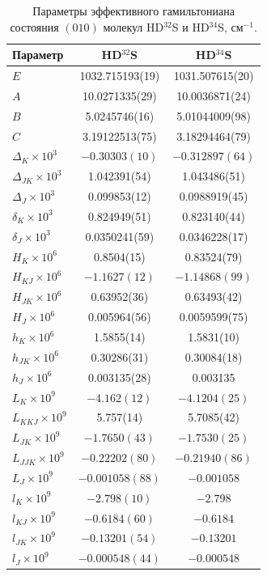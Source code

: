 \begin{table}[htbp]
\centering
\caption{Параметры эффективного гамильтониана состояния $(010)$ молекул HD$^{32}$S и HD$^{34}$S,
см$^{-1}$.}
\label{tab:hds_010_parameters}
\scriptsize
\begin{tabular}{l c c}
\hline
Параметр & HD$^{32}$S & HD$^{34}$S \\
\hline
$E$ & 1032.715193(19) & 1031.507615(20) \\
$A$ & 10.0271335(29) & 10.0036871(24) \\
$B$ & 5.0245746(16) & 5.01044009(98) \\
$C$ & 3.19122513(75) & 3.18294464(79) \\
$\Delta_K\times10^3$ & $-0.30303(10)$ & $-0.312897(64)$ \\
$\Delta_{JK}\times10^3$ & 1.042391(54) & 1.043486(51) \\
$\Delta_J\times10^3$ & 0.099853(12) & 0.0988919(45) \\
$\delta_K\times10^3$ & 0.824949(51) & 0.823140(44) \\
$\delta_J\times10^3$ & 0.0350241(59) & 0.0346228(17) \\
$H_K\times10^6$ & 0.8504(15) & 0.83524(79) \\
$H_{KJ}\times10^6$ & $-1.1627(12)$ & $-1.14868(99)$ \\
$H_{JK}\times10^6$ & 0.63952(36) & 0.63493(42) \\
$H_J\times10^6$ & 0.005964(56) & 0.0059599(75) \\
$h_K\times10^6$ & 1.5855(14) & 1.5831(10) \\
$h_{JK}\times10^6$ & 0.30286(31) & 0.30084(18) \\
$h_J\times10^6$ & 0.003135(28) & 0.003135 \\
$L_K\times10^9$ & $-4.162(12)$ & $-4.1204(25)$ \\
$L_{KKJ}\times10^9$ & 5.757(14) & 5.7085(42) \\
$L_{JK}\times10^9$ & $-1.7650(43)$ & $-1.7530(25)$ \\
$L_{JJK}\times10^9$ & $-0.22202(80)$ & $-0.21940(86)$ \\
$L_J\times10^9$ & $-0.001058(88)$ & $-0.001058$ \\
$l_K\times10^9$ & $-2.798(10)$ & $-2.798$ \\
$l_{KJ}\times10^9$ & $-0.6184(60)$ & $-0.6184$ \\
$l_{JK}\times10^9$ & $-0.13201(54)$ & $-0.13201$ \\
$l_J\times10^9$ & $-0.000548(44)$ & $-0.000548$ \\

\end{tabular}
\end{table}
